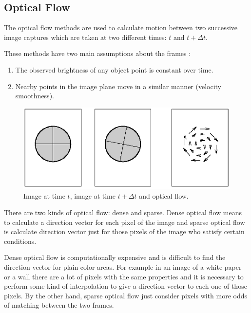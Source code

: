 \subsection{Optical Flow}

The optical flow methods are used to calculate motion between two successive image captures which are taken
 at two different times: $t$ and $t + \Delta t$.

These methods have two main assumptions about the frames \cite{sonka2007}:

\begin{enumerate}
\item The observed brightness of any object point is constant over time.
\item Nearby points in the image plane move in a similar manner (velocity smoothness).
\end{enumerate}

\begin{figure}[h!]
\begin{center}
\includegraphics[scale=0.6]{images/oflow}
\caption{Image at time $t$, image at time $t + \Delta t$ and optical flow.}
\label{fig:oflow}
\end{center}
\end{figure}

There are two kinds of optical flow: dense and sparse. Dense optical flow means to calculate a direction vector for each pixel of the image and sparse optical flow is calculate direction vector just for those pixels of the image 
who satisfy certain conditions.

Dense optical flow is computationally expensive and is difficult to find the direction vector 
for plain color areas. For example in an image of a white paper or a wall
there are a lot of pixels with the same properties and it is necessary to perform some kind of interpolation to give a direction vector
 to each one of those pixels. 
By the other hand, sparse optical flow just consider pixels with more odds of matching between the two frames.

